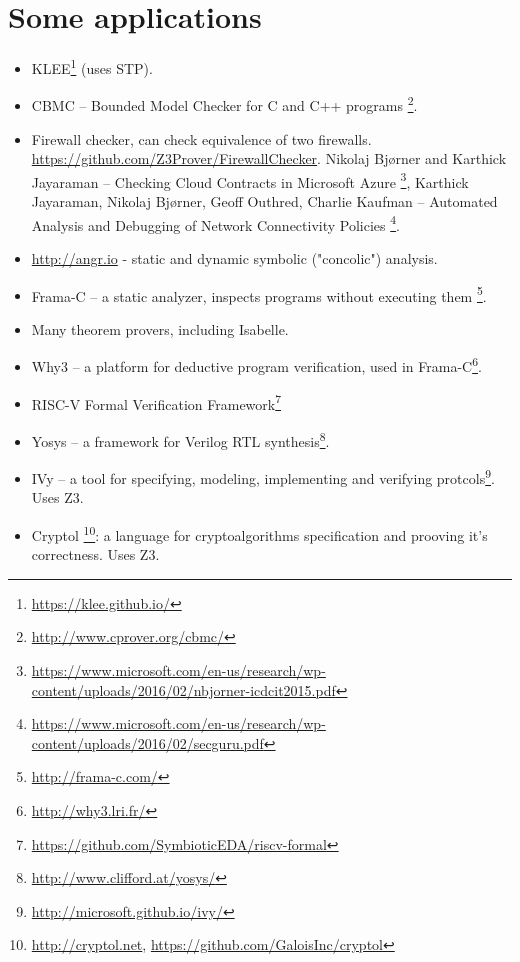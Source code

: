 \chapter{Some applications}

\begin{itemize}

\item KLEE\footnote{\url{https://klee.github.io/}} (uses STP).

\item CBMC -- Bounded Model Checker for C and C++ programs
\footnote{\url{http://www.cprover.org/cbmc/}}.

\item Firewall checker, can check equivalence of two firewalls.
\url{https://github.com/Z3Prover/FirewallChecker}.
Nikolaj Bjørner and Karthick Jayaraman -- Checking Cloud Contracts in Microsoft Azure
\footnote{\url{https://www.microsoft.com/en-us/research/wp-content/uploads/2016/02/nbjorner-icdcit2015.pdf}},
Karthick Jayaraman, Nikolaj Bjørner, Geoff Outhred, Charlie Kaufman -- Automated Analysis and Debugging of Network Connectivity Policies
\footnote{\url{https://www.microsoft.com/en-us/research/wp-content/uploads/2016/02/secguru.pdf}}.

\item \url{http://angr.io} - static and dynamic symbolic ("concolic") analysis.

\item Frama-C -- a static analyzer, inspects programs without executing them
\footnote{\url{http://frama-c.com/}}.

\item Many theorem provers, including Isabelle.

\item Why3 -- a platform for deductive program verification,
used in Frama-C\footnote{\url{http://why3.lri.fr/}}.

\item RISC-V Formal Verification Framework\footnote{\url{https://github.com/SymbioticEDA/riscv-formal}}

\item Yosys -- a framework for Verilog RTL synthesis\footnote{\url{http://www.clifford.at/yosys/}}.

\item IVy -- a tool for specifying, modeling, implementing and verifying protcols\footnote{\url{http://microsoft.github.io/ivy/}}. Uses Z3.

\item Cryptol
\footnote{\url{http://cryptol.net}, \url{https://github.com/GaloisInc/cryptol}}:
a language for cryptoalgorithms specification and prooving it's correctness. Uses Z3.

\end{itemize}

